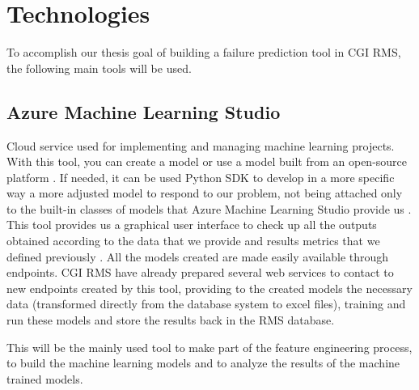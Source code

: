 


\chapter{Technologies}
\label{cha:introduction}

To accomplish our thesis goal of building a failure prediction tool in CGI RMS, the following main tools will be used.


\section{Azure Machine Learning Studio} 
\label{sub:if_you_use_this_template}

Cloud service used for implementing and managing machine learning projects. With this tool, you can create a model or use a model built from an open-source platform \cite{AZURE_MACHINE_LEARNING}.
If needed, it can be used Python SDK to develop in a more specific way a more adjusted model to respond to our problem, not being attached only to the built-in classes of models that Azure Machine Learning Studio provide us \cite{AZURE_MACHINE_LEARNING}.
This tool provides us a graphical user interface to check up all the outputs obtained according to the data that we provide and results metrics that we defined previously \cite{AZURE_MACHINE_LEARNING}.
All the models created are made easily available through endpoints. CGI RMS have already prepared several web services to contact to new endpoints created by this tool, providing to the created models the necessary data (transformed directly from the database system to excel files), training and run these models and store the results back in the RMS database.

This will be the mainly used tool to make part of the feature engineering process, to build the machine learning models and to analyze the results of the machine trained models.


